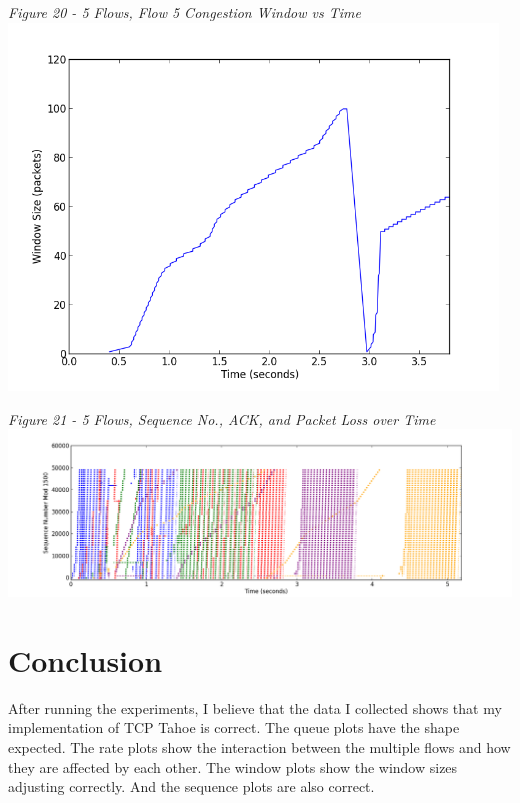 \documentclass[11pt]{article}
\begin{document}
\textit{Figure 20 - 5 Flows, Flow 5 Congestion Window vs Time}
\\
\includegraphics[width=13cm]{5_data/5_5-window}
\vspace{0.25cm}

\textit{Figure 21 - 5 Flows, Sequence No., ACK, and Packet Loss over Time}
\\
\includegraphics[width=18cm]{5_data/5-sequence}
\vspace{0.25cm}

\section{Conclusion}

After running the experiments, I believe that the data I collected shows that my implementation of TCP Tahoe is correct. The queue plots have the shape expected. The rate plots show the interaction between the multiple flows and how they are affected by each other. The window plots show the window sizes adjusting correctly. And the sequence plots are also correct.
\end{document}
